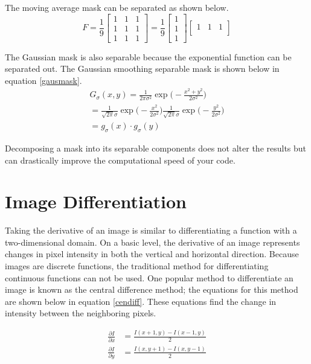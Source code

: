 \documentclass[twoside]{article}
\begin{document}
The moving average mask can be separated as shown below.
\[
F = \frac{1}{9}
\begin{bmatrix}
1 & 1 & 1\\
1 & 1 & 1\\
1 & 1 & 1
\end{bmatrix} = \frac{1}{9}
\begin{bmatrix}
1 \\
1 \\
1
\end{bmatrix}
\begin{bmatrix}
1 & 1 & 1\\
\end{bmatrix}
\]

The Gaussian mask is also separable because the exponential function can be separated out. The Gaussian smoothing separable mask is shown below in equation \ref{gausmask}.
\begin{equation}
\label{gausmask}
  \begin{aligned}
    G_\sigma(x,y) = \frac{1}{2\pi\sigma^2} \exp \bigg(-\frac{x^2 + y^2}{2\sigma^2} \bigg)\\
    = \frac{1}{\sqrt{2\pi}\sigma}\exp \bigg(-\frac{x^2}{2\sigma^2}\bigg)\frac{1}{\sqrt{2\pi}\sigma} \exp \bigg(-\frac{y^2}{2\sigma^2}\bigg) \\
    = g_\sigma(x) \cdot g_\sigma(y)
  \end{aligned}
\end{equation}

Decomposing a mask into its separable components does not alter the results but can drastically improve the computational speed of your code.

\section{Image Differentiation}
Taking the derivative of an image is similar to differentiating a function with a two-dimensional domain. On a basic level, the derivative of an image represents changes in pixel intensity in both the vertical and horizontal direction. Because images are discrete functions, the traditional method for differentiating continuous functions can not be used. One popular method to differentiate an image is known as the central difference method; the equations for this method are shown below in equation \ref{cendiff}. These equations find the change in intensity between the neighboring pixels.

\begin{equation}
  \label{cendiff}
  \begin{aligned}
    \frac{\partial I} {\partial x} &= \frac{I(x+1,y) - I(x-1,y)}{2}\\
    \frac{\partial I} {\partial y} &= \frac{I(x,y+1) - I(x,y-1)}{2}
  \end{aligned}
\end{equation}
\end{document}
